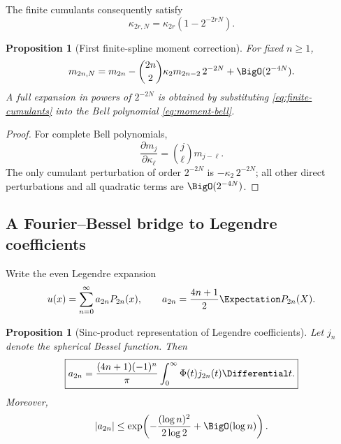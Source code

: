 \documentclass[11pt,oneside]{article}
\newtheorem{proposition}[theorem]{Proposition}
\theoremstyle{definition}
\theoremstyle{remark}
\begin{document}
The finite cumulants consequently satisfy
\begin{equation}
 \kappa_{2r,N}=\kappa_{2r}(1-2^{-2rN}).
 \label{eq:finite-cumulants}
\end{equation}

\begin{proposition}[First finite-spline moment correction]
\label{prop:moment-convergence}
For fixed \(n\geq1\),
\begin{equation}
 m_{2n,N}
 =m_{2n}
 -\binom{2n}{2}\kappa_2m_{2n-2}\,2^{-2N}
 +\BigO(2^{-4N}).
 \label{eq:moment-convergence}
\end{equation}
A full expansion in powers of \(2^{-2N}\) is obtained by substituting
\eqref{eq:finite-cumulants} into the Bell polynomial
\eqref{eq:moment-bell}.
\end{proposition}

\begin{proof}
For complete Bell polynomials,
\[
 \frac{\partial m_j}{\partial\kappa_\ell}
 =\binom j\ell m_{j-\ell}.
\]
The only cumulant perturbation of order \(2^{-2N}\) is
\(-\kappa_2\,2^{-2N}\); all other direct perturbations and all quadratic
terms are \(\BigO(2^{-4N})\).
\end{proof}

\subsection{A Fourier--Bessel bridge to Legendre coefficients}

Write the even Legendre expansion
\begin{equation}
 u(x)=\sum_{n=0}^{\infty}a_{2n}P_{2n}(x),
 \qquad
 a_{2n}=\frac{4n+1}{2}\Expectation P_{2n}(X).
 \label{eq:Legendre}
\end{equation}

\begin{proposition}[Sinc-product representation of Legendre coefficients]
\label{prop:legendre-bessel}
Let \(j_n\) denote the spherical Bessel function.  Then
\begin{equation}
 \boxed{\displaystyle
 a_{2n}
 =\frac{(4n+1)(-1)^n}{\pi}
   \int_0^\infty \Phi(t)j_{2n}(t)\Differential t.}
 \label{eq:legendre-bessel}
\end{equation}
Moreover,
\begin{equation}
 |a_{2n}|
 \leq
 \exp\!\left(
  -\frac{(\log n)^2}{2\log2}+\BigO(\log n)
 \right).
 \label{eq:legendre-envelope}
\end{equation}
\end{proposition}
\end{document}
